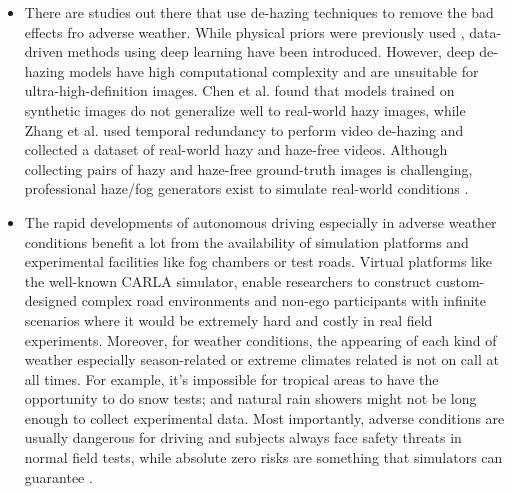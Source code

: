 \documentclass[rnd]{mas_proposal}
\begin{document}
\begin{itemize}
    \item There are studies out there that use de-hazing techniques to remove the bad effects fro adverse weather. While physical priors were previously used \cite{tan2008visibility} \cite{tarel2009fast}, data-driven methods using deep learning have been introduced. However, deep de-hazing models have high computational complexity and are unsuitable for ultra-high-definition images. Chen et al. \cite{chen2021psd} found that models trained on synthetic images do not generalize well to real-world hazy images, while Zhang et al. \cite{zhang2021learning} used temporal redundancy to perform video de-hazing and collected a dataset of real-world hazy and haze-free videos. Although collecting pairs of hazy and haze-free ground-truth images is challenging, professional haze/fog generators exist to simulate real-world conditions \cite{musat2021multi} \cite{timofte2018ntire}.

    \item The rapid developments of autonomous driving especially in adverse weather conditions benefit a lot from the availability of simulation platforms and experimental facilities like fog chambers or test roads. Virtual platforms like the well-known CARLA \cite{dosovitskiy2017carla} simulator, enable researchers to construct custom-designed complex road environments and non-ego participants with infinite scenarios where it would be extremely hard and costly in real field experiments. Moreover, for weather conditions, the appearing of each kind of weather especially season-related or extreme climates related is not on call at all times. For example, it’s impossible for tropical areas to have the opportunity to do snow tests; and natural rain showers might not be long enough to collect experimental data. Most importantly, adverse conditions are usually dangerous for driving and subjects always face safety threats in normal field tests, while absolute zero risks are something that simulators can guarantee \cite{Zhang2021Dec}.

    


\end{itemize}
\end{document}

